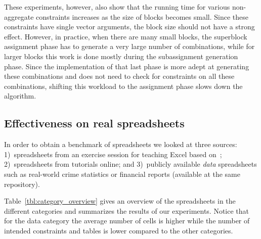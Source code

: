 These experiments, however, also show that the running time for various non-aggregate constraints increases as the size of blocks becomes small.
Since these constraints have single vector arguments, the block size should not have a strong effect.
However, in practice, when there are many small blocks, the superblock assignment phase has to generate a very large number of combinations, while for larger blocks this work is done mostly during the subassignment generation phase.
Since the implementation of that last phase is more adept at generating these combinations and does not need to check for constraints on all these combinations, shifting this workload to the assignment  phase slows down the algorithm. 



\subsection{Effectiveness on real spreadsheets}
In order to obtain a benchmark of spreadsheets we looked at three sources:
1)~spreadsheets from an exercise session for teaching Excel based on~\cite{excel_book}; 2)~spreadsheets from tutorials online; and 3)~publicly available \textit{data} spreadsheets such as real-world crime statistics or financial reports (available at the same repository).

Table~\ref{tbl:category_overview} gives an overview of the spreadsheets in the different categories and summarizes the results of our experiments.
Notice that for the data category the average number of cells is higher while the number of intended constraints and tables is lower compared to the other categories. 

